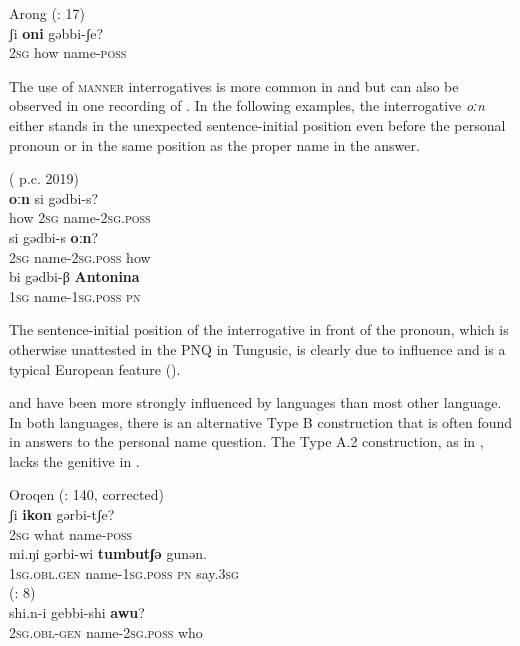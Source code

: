 \documentclass[output=paper,colorlinks,citecolor=brown]{langscibook}
\begin{document}
\ea
    \label{example4.77}
    Arong  (\citealt{ChaokeKalina2017H}: 17)\\
    \gll ʃi		\textbf{oni}		gəbbi-ʃe?\\
    2\textsc{sg}		how		name-\textsc{poss}\\
    \z

The use of \textsc{manner} interrogatives is more common in  and  but can also be observed in one recording of . In the following examples, the interrogative \textit{oːn} either stands in the unexpected sentence-initial position even before the personal pronoun or in the same position as the proper name in the answer.

\ea
    \label{example4.78}
     ( p.c. 2019)\\
    \ea
    \gll \textbf{oːn}		si		gədbi-s?\\
    how		2\textsc{sg}		name-2\textsc{sg.poss}\\

    \ex
    \gll si		gədbi-s			\textbf{oːn}?\\
    2\textsc{sg}		name-2\textsc{sg.poss}		how\\

    \ex
    \gll bi		gədbi-β			\textbf{Antonina}\\
    1\textsc{sg}		name-1\textsc{sg.poss}		\textsc{pn}\\
    \z
\z

\noindent The sentence-initial position of the interrogative in front of the pronoun, which is otherwise unattested in the PNQ in Tungusic, is clearly due to  influence and is a typical European feature (\citealt{Dryer2013}).

 and  have been more strongly influenced by  languages than most other  language. In both languages, there is an alternative Type B construction that is often found in answers to the personal name question. The Type A.2 construction, as in , lacks the genitive in .

\ea
    \label{example4.79}
     Oroqen (\citealt{Chaoke2007}: 140, corrected)\\
    \ea
    \gll ʃi			\textbf{ikon}		gərbi-tʃe?\\
    2\textsc{sg}			what			name-\textsc{poss}\\

    \ex
    \gll mi.ŋi		gərbi-wi			\textbf{tumbutʃə}	gunən.\\
    1\textsc{sg.obl.gen}	name-1\textsc{sg.poss}		\textsc{pn}			say.3\textsc{sg}\\
    \z
\ex
    \label{example4.80}
     (\citealt{Chaokeetal2014}: 8)\\
    \ea
    \gll shi.n-i			gebbi-shi		\textbf{awu}?\\
    2\textsc{sg.obl-gen}		name-2\textsc{sg.poss}		who\\
\end{document}

